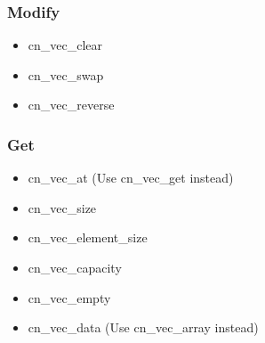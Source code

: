 \documentclass[12pt]{article}
\begin{document}
\subsubsection{Modify}\begin{itemize}
	\item cn_vec_clear

	\item cn_vec_swap

	\item cn_vec_reverse

\end{itemize}
\subsubsection{Get}\begin{itemize}
	\item cn_vec_at (Use cn_vec_get instead)

	\item cn_vec_size

	\item cn_vec_element_size

	\item cn_vec_capacity

	\item cn_vec_empty

	\item cn_vec_data (Use cn_vec_array instead)

\end{itemize}
\end{document}
